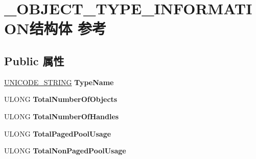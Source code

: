\hypertarget{struct___o_b_j_e_c_t___t_y_p_e___i_n_f_o_r_m_a_t_i_o_n}{}\section{\+\_\+\+O\+B\+J\+E\+C\+T\+\_\+\+T\+Y\+P\+E\+\_\+\+I\+N\+F\+O\+R\+M\+A\+T\+I\+O\+N结构体 参考}
\label{struct___o_b_j_e_c_t___t_y_p_e___i_n_f_o_r_m_a_t_i_o_n}
\subsection*{Public 属性}
\begin{DoxyCompactItemize}
\item 
\mbox{\label{struct___o_b_j_e_c_t___t_y_p_e___i_n_f_o_r_m_a_t_i_o_n_aea70a925b2d08ee7ad5ac1e4af2c975e}} 
\hyperlink{struct___u_n_i_c_o_d_e___s_t_r_i_n_g}{U\+N\+I\+C\+O\+D\+E\+\_\+\+S\+T\+R\+I\+NG} {\bfseries Type\+Name}
\item 
\mbox{\label{struct___o_b_j_e_c_t___t_y_p_e___i_n_f_o_r_m_a_t_i_o_n_a6143724a804656953541001a2f4e7f31}} 
U\+L\+O\+NG {\bfseries Total\+Number\+Of\+Objects}
\item 
\mbox{\label{struct___o_b_j_e_c_t___t_y_p_e___i_n_f_o_r_m_a_t_i_o_n_ac68457220861cd98f770006ac39acdc8}} 
U\+L\+O\+NG {\bfseries Total\+Number\+Of\+Handles}
\item 
\mbox{\label{struct___o_b_j_e_c_t___t_y_p_e___i_n_f_o_r_m_a_t_i_o_n_abf26280d19448f2bb251be34c6f54d11}} 
U\+L\+O\+NG {\bfseries Total\+Paged\+Pool\+Usage}
\item 
\mbox{\label{struct___o_b_j_e_c_t___t_y_p_e___i_n_f_o_r_m_a_t_i_o_n_aeec5b4184d6af108b2350632471a1483}} 
U\+L\+O\+NG {\bfseries Total\+Non\+Paged\+Pool\+Usage}
\item 
\mbox{\label{struct___o_b_j_e_c_t___t_y_p_e___i_n_f_o_r_m_a_t_i_o_n_a27e82954b83eecdfd567176247a4cff8}} 

\end{DoxyCompactItemize}
